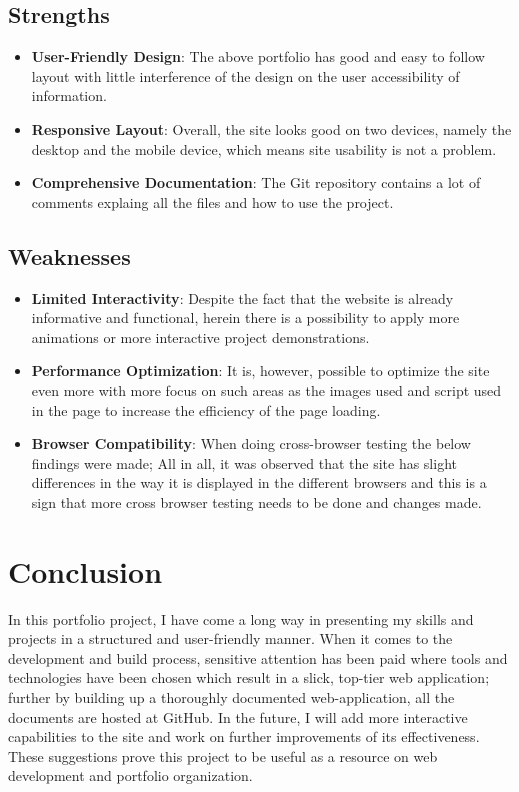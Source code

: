 \documentclass{article}
\begin{document}
\subsection{Strengths}
\begin{itemize}
\item \textbf{User-Friendly Design}: The above portfolio has good and easy to follow layout with little interference of the design on the user accessibility of information.
\item \textbf{Responsive Layout}: Overall, the site looks good on two devices, namely the desktop and the mobile device, which means site usability is not a problem.
\item \textbf{Comprehensive Documentation}: The Git repository contains a lot of comments explaing all the files and how to use the project.
\end{itemize}

\subsection{Weaknesses}
\begin{itemize}
\item \textbf{Limited Interactivity}: Despite the fact that the website is already informative and functional, herein there is a possibility to apply more animations or more interactive project demonstrations.
\item \textbf{Performance Optimization}: It is, however, possible to optimize the site even more with more focus on such areas as the images used and script used in the page to increase the efficiency of the page loading.
\item \textbf{Browser Compatibility}: When doing cross-browser testing the below findings were made; All in all, it was observed that the site has slight differences in the way it is displayed in the different browsers and this is a sign that more cross browser testing needs to be done and changes made.
\end{itemize}

\section{Conclusion}
In this portfolio project, I have come a long way in presenting my skills and projects in a structured and user-friendly manner. When it comes to the development and build process, sensitive attention has been paid where tools and technologies have been chosen which result in a slick, top-tier web application; further by building up a thoroughly documented web-application, all the documents are hosted at GitHub. In the future, I will add more interactive capabilities to the site and work on further improvements of its effectiveness. These suggestions prove this project to be useful as a resource on web development and portfolio organization.
\end{document}
